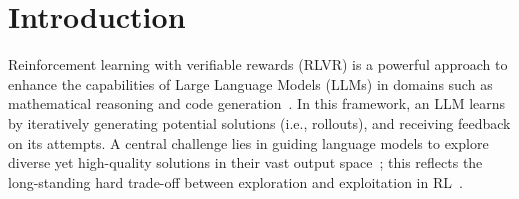 \section{Introduction}
\label{sec:introduction}


Reinforcement learning with verifiable rewards (RLVR) is a powerful approach to enhance the capabilities of Large Language Models (LLMs) in domains such as mathematical reasoning and code generation~\citep{openai2024learning, guo2025deepseek, team2025kimi, yang2025qwen3}. 
In this framework, an LLM learns by iteratively generating potential solutions (i.e., rollouts), and receiving feedback on its attempts. 
A central challenge lies in guiding language models to explore diverse yet high-quality solutions in their vast output space~\citep{cheng2025reasoning};
this reflects the long-standing hard trade-off between exploration and exploitation in RL~\citep{thrun1992efficient, sutton1998reinforcement}.

